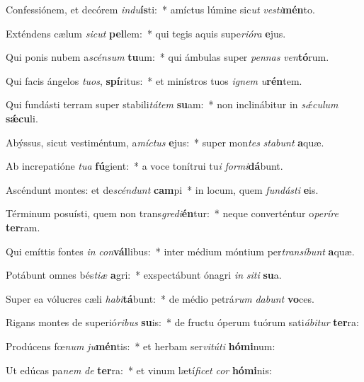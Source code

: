 \item Confessiónem, et decórem \textit{ind}\textit{u}\textbf{ís}ti:~* amíctus lúmine sic\textit{ut} \textit{ves}\textit{ti}\textbf{mén}to.
\item Exténdens cælum \textit{sic}\textit{ut} \textbf{pel}lem:~* qui tegis aquis supe\textit{ri}\textit{ó}\textit{ra} \textbf{e}jus.
\item Qui ponis nubem a\textit{scén}\textit{sum} \textbf{tu}um:~* qui ámbulas super \textit{pen}\textit{nas} \textit{ven}\textbf{tó}rum.
\item Qui facis ángelos \textit{tu}\textit{os}, \textbf{spí}ritus:~* et minístros tuos \textit{i}\textit{gnem} \textit{u}\textbf{rén}tem.
\item Qui fundásti terram super stabili\textit{tá}\textit{tem} \textbf{su}am:~* non inclinábitur in \textit{sǽ}\textit{cu}\textit{lum} \textbf{sǽ}\textbf{cu}li.
\item Abýssus, sicut vestiméntum, a\textit{míc}\textit{tus} \textbf{e}jus:~* super mon\textit{tes} \textit{sta}\textit{bunt} \textbf{a}quæ.
\item Ab increpatióne \textit{tu}\textit{a} \textbf{fú}gient:~* a voce tonítrui tu\textit{i} \textit{for}\textit{mi}\textbf{dá}bunt.
\item Ascéndunt montes: et de\textit{scén}\textit{dunt} \textbf{cam}pi~* in locum, quem \textit{fun}\textit{dás}\textit{ti} \textbf{e}is.
\item Términum posuísti, quem non trans\textit{gre}\textit{di}\textbf{én}tur:~* neque converténtur o\textit{pe}\textit{rí}\textit{re} \textbf{ter}ram.
\item Qui emíttis fontes \textit{in} \textit{con}\textbf{vál}libus:~* inter médium móntium per\textit{trans}\textit{í}\textit{bunt} \textbf{a}quæ.
\item Potábunt omnes bés\textit{ti}\textit{æ} \textbf{a}gri:~* exspectábunt ónagri \textit{in} \textit{si}\textit{ti} \textbf{su}a.
\item Super ea vólucres cæli \textit{ha}\textit{bi}\textbf{tá}bunt:~* de médio petrá\textit{rum} \textit{da}\textit{bunt} \textbf{vo}ces.
\item Rigans montes de superió\textit{ri}\textit{bus} \textbf{su}is:~* de fructu óperum tuórum sati\textit{á}\textit{bi}\textit{tur} \textbf{ter}ra:
\item Prodúcens fœ\textit{num} \textit{ju}\textbf{mén}tis:~* et herbam ser\textit{vi}\textit{tú}\textit{ti} \textbf{hó}\textbf{mi}num:
\item Ut edúcas pa\textit{nem} \textit{de} \textbf{ter}ra:~* et vinum lætí\textit{fi}\textit{cet} \textit{cor} \textbf{hó}\textbf{mi}nis:
